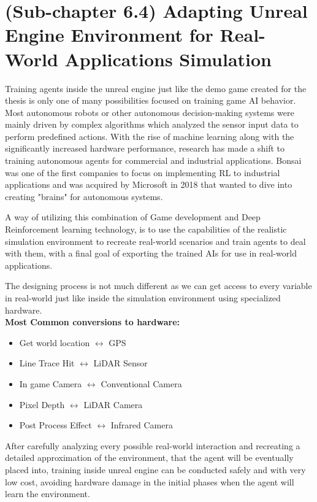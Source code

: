 \documentclass[a4paper,one side,12pt]{book}
\begin{document}
\section{(Sub-chapter 6.4) Adapting Unreal Engine Environment for Real-World Applications Simulation}

Training agents inside the unreal engine just like the demo game created for the thesis is only one of many possibilities focused on training game AI behavior. Most autonomous robots or other autonomous decision-making systems were mainly driven by complex algorithms which analyzed the sensor input data to perform predefined actions. With the rise of machine learning along with the significantly increased hardware performance, research has made a shift to training autonomous agents for commercial and industrial applications.
Bonsai\cite{bonsai_2020} was one of the first companies to focus on implementing RL to industrial applications and was acquired by Microsoft in 2018 that wanted to dive into creating "brains" for autonomous systems\cite{gurdeep_2018}.

A way of utilizing this combination of Game development and Deep
Reinforcement learning technology, is to use the capabilities of the
realistic simulation environment to recreate real-world scenarios and
train agents to deal with them, with a final goal of exporting the
trained AIs for use in real-world applications.

The designing process is not much different as we can get access to
every variable in real-world just like inside the simulation environment using specialized hardware.\\

\textbf{Most Common conversions to hardware:
}
\begin{itemize}
\item
  Get world location $\longleftrightarrow$ GPS
\item
  Line Trace Hit $\longleftrightarrow$  LiDAR Sensor
\item
  In game Camera $\longleftrightarrow$  Conventional Camera
\item
  Pixel Depth $\longleftrightarrow$  LiDAR Camera
\item
  Post Process Effect $\longleftrightarrow$  Infrared Camera
\end{itemize}

After carefully analyzing every possible real-world interaction and
recreating a detailed approximation of the environment, that the agent
will be eventually placed into, training inside unreal engine can be
conducted safely and with very low cost, avoiding hardware damage in
the initial phases when the agent will learn the environment.
\end{document}
